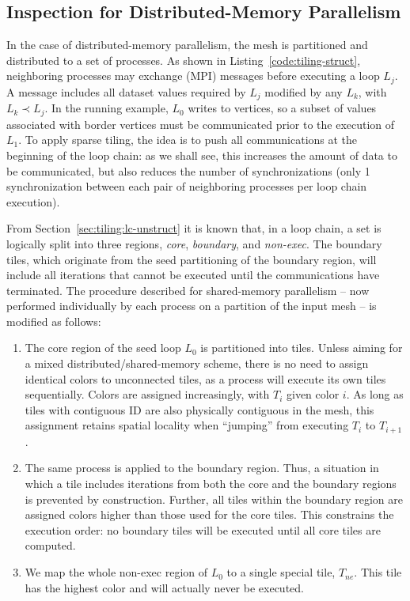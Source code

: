 \subsection*{Inspection for Distributed-Memory Parallelism}
In the case of distributed-memory parallelism, the mesh is partitioned and distributed to a set of processes. As shown in Listing~\ref{code:tiling-struct}, neighboring processes may exchange (MPI) messages before executing a loop $L_j$. A message includes all dataset values required by $L_j$ modified by any $L_k$, with $L_k \prec L_j$. In the running example, $L_0$ writes to vertices, so a subset of values associated with border vertices must be communicated prior to the execution of $L_1$. To apply sparse tiling, the idea is to push all communications at the beginning of the loop chain: as we shall see, this increases the amount of data to be communicated, but also reduces  the number of synchronizations (only 1 synchronization between each pair of neighboring processes per loop chain execution).

From Section~\ref{sec:tiling:lc-unstruct} it is known that, in a loop chain, a set is logically split into three regions, \textit{core}, \textit{boundary}, and \textit{non-exec}. The boundary tiles, which originate from the seed partitioning of the boundary region, will include all iterations that cannot be executed until the communications have terminated. The procedure described for shared-memory parallelism -- now performed individually by each process on a partition of the input mesh -- is modified as follows:
\begin{enumerate}
\item The core region of the seed loop $L_0$ is partitioned into tiles. Unless aiming for a mixed distributed/shared-memory scheme, there is no need to assign identical colors to unconnected tiles, as a process will execute its own tiles sequentially. Colors are assigned increasingly, with $T_i$ given color $i$. As long as tiles with contiguous ID are also physically contiguous in the mesh, this assignment retains spatial locality when ``jumping'' from executing $T_i$ to $T_{i+1}$.
\item The same process is applied to the boundary region. Thus, a situation in which a tile includes iterations from both the core and the boundary regions is prevented by construction. Further, all tiles within the boundary region are assigned colors higher than those used for the core tiles. This constrains the execution order: no boundary tiles will be executed until all core tiles are computed.
\item We map the whole non-exec region of $L_0$ to a single special tile, $T_{ne}$. This tile has the highest color and will actually never be executed. 
\end{enumerate}

